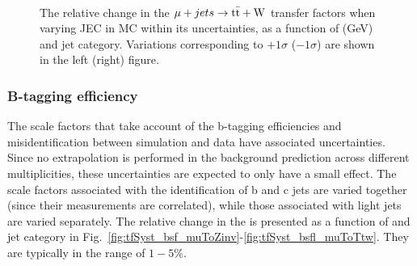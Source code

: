 \begin{figure}[!h]
  \centering
   ~~
  \\

  \caption{\label{fig:tfSyst_jec_muToTtw} The relative change in the
  $\mu + jets \rightarrow \mathrm{t\bar{t}+W}$ transfer
  factors when varying JEC in MC within its uncertainties, as a function of \scalht (GeV) and jet category. 
  Variations corresponding to $+1\sigma$ ($-1\sigma$) are shown in the left (right) figure. 
  }
\end{figure}


\subsubsection*{B-tagging efficiency}
\label{sec:tfSyst_btag}
The scale factors that take account of the b-tagging efficiencies and
misidentification between simulation and data have associated
uncertainties. Since no extrapolation is performed in the background
prediction across different \nb multiplicities, these uncertainties
are expected to only have a small effect.  The scale factors
associated with the identification of b and c jets are varied together
(since their measurements are correlated), while those associated with
light jets are varied separately. The relative change in the \TFs is
presented as a function of \HT and jet category in
Fig.~\ref{fig:tfSyst_bsf_muToZinv}-\ref{fig:tfSyst_bsfl_muToTtw}. They
are typically in the range of $1-5\%$.

